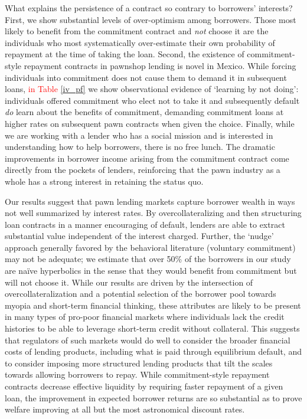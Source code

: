 \documentclass[oneside,11pt]{article}
\begin{document}
What explains the persistence of a contract so contrary to borrowers’ interests?  First, we show substantial levels of over-optimism among borrowers.  Those most likely to benefit from the commitment contract and \textit{not} choose it are the individuals who most systematically over-estimate their own probability of repayment at the time of taking the loan.  Second, the existence of commitment-style repayment contracts in pawnshop lending is novel in Mexico.  While forcing individuals into commitment does not cause them to demand it in subsequent loans, \textcolor{red}{in Table \ref{iv_pf}} we show observational evidence of `learning by not doing’:  individuals offered commitment who elect not to take it and subsequently default \textit{do} learn about the benefits of commitment, demanding commitment loans at higher rates on subsequent pawn contracts when given the choice.  Finally, while we are working with a lender who has a social mission and is interested in understanding how to help borrowers, there is no free lunch.  The dramatic improvements in borrower income arising from the commitment contract come directly from the pockets of lenders, reinforcing that the pawn industry as a whole has a strong interest in retaining the status quo.

Our results suggest that pawn lending markets capture borrower wealth in ways not well summarized by interest rates.  By overcollateralizing and then structuring loan contracts in a manner encouraging of default, lenders are able to extract substantial value independent of the interest charged.  Further, the `nudge’ approach generally favored by the behavioral literature (voluntary commitment) may not be adequate; we estimate that over 50\% of the borrowers in our study are naïve hyperbolics in the sense that they would benefit from commitment but will not choose it.  While our results are driven by the intersection of overcollateralization and a potential selection of the borrower pool towards myopia and short-term financial thinking, these attributes are likely to be present in many types of pro-poor financial markets where individuals lack the credit histories to be able to leverage short-term credit without collateral.  This suggests that regulators of such markets would do well to consider the broader financial costs of lending products, including what is paid through equilibrium default, and to consider imposing more structured lending products that tilt the scales towards allowing borrowers to repay.  While commitment-style repayment contracts decrease effective liquidity by requiring faster repayment of a given loan, the improvement in expected borrower returns are so substantial as to prove welfare improving at all but the most astronomical discount rates.  
\end{document}
